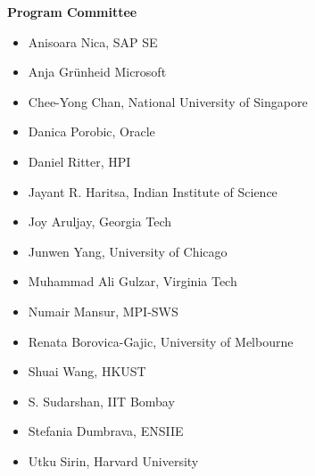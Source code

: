 \documentclass[sigconf]{acmart}
\begin{document}
\textbf{Program Committee}
\begin{itemize}
	\item Anisoara Nica, SAP SE
	\item Anja Grünheid Microsoft
	\item Chee-Yong Chan, National University of Singapore
	\item Danica Porobic, Oracle
	\item Daniel Ritter, HPI
	\item Jayant R. Haritsa, Indian Institute of Science
	\item Joy Aruljay, Georgia Tech
	\item Junwen Yang, University of Chicago
	\item Muhammad Ali Gulzar, Virginia Tech
	\item Numair Mansur, MPI-SWS
	\item Renata Borovica-Gajic, University of Melbourne
	\item Shuai Wang, HKUST
	\item S. Sudarshan, IIT Bombay
	\item Stefania Dumbrava, ENSIIE
	\item Utku Sirin, Harvard University
\end{itemize}
\end{document}
